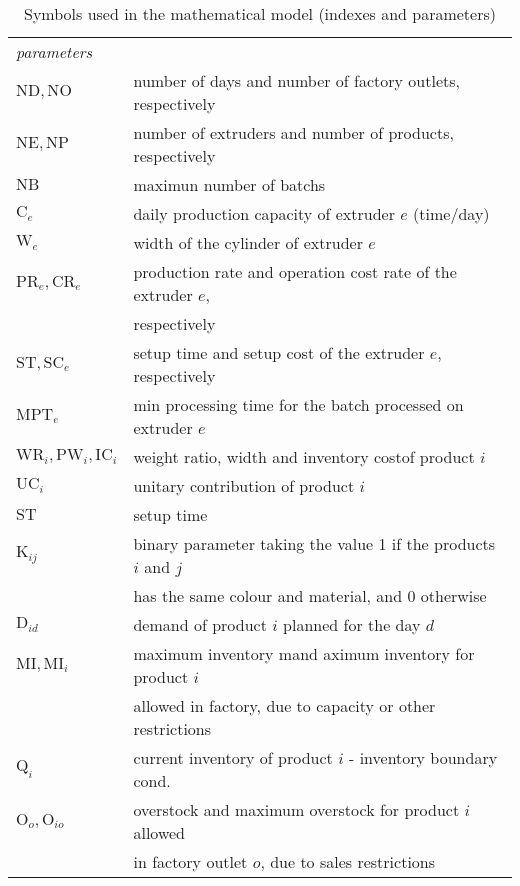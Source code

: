 \begin{table}[h!]
\begin{center}
\begin{tabular}{ l l }
		\multicolumn{2}{l}{\emph{parameters}} \\ 
		$\mathrm{ND}, \mathrm{NO}$ & number of days and number of factory outlets, respectively\\
		$\mathrm{NE}, \mathrm{NP}$ & number of extruders and number of products, respectively \\ 
		$\mathrm{NB}$ & maximun number of batchs \\ 
		$\mathrm{C}_e$ & daily production capacity of extruder $e$ (time/day)\\ 
		$\mathrm{W}_e$ & width of the cylinder of extruder $e$ \\ 
		$\mathrm{PR}_e, \mathrm{CR}_e$ & production rate and operation cost rate of the extruder $e$, \\
		 & respectively \\ 
		$\mathrm{ST}, \mathrm{SC}_e$ & setup time and setup cost of the extruder $e$, respectively\\ 
		$\mathrm{MPT}_e$ & min processing time for the batch processed on extruder $e$ \\ 
		$\mathrm{WR}_i, \mathrm{PW}_i, \mathrm{IC}_i$ & weight ratio, width and inventory costof product $i$\\ 
		$\mathrm{UC}_i$ & unitary contribution of product $i$ \\ 
		$\mathrm{ST}$ & setup time \\
		$\mathrm{K}_{ij}$ & binary parameter taking the value 1 if the products $i$ and $j$ \\
		& has the same colour and material, and 0 otherwise \\
		$\mathrm{D}_{id}$ & demand of product $i$ planned for the day $d$ \\ 
		$\mathrm{MI}, \mathrm{MI}_i$ & maximum inventory mand aximum inventory for product $i$ \\
		& allowed in factory, due to capacity or other restrictions \\ 
		$\mathrm{Q}_i$ & current inventory of product $i$ - inventory boundary cond. \\ 
		$\mathrm{O}_{o}, \mathrm{O}_{io}$ & overstock and maximum overstock for product $i$ allowed \\
		& in factory outlet $o$, due to sales restrictions \\ 
		\end{tabular}
\caption{Symbols used in the mathematical model (indexes and parameters)}
\label{tab:symbols1}
\end{center}
\end{table}

